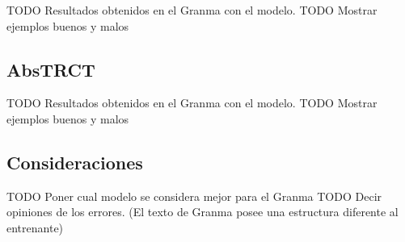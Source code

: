 TODO Resultados obtenidos en el Granma con el modelo.
TODO Mostrar ejemplos buenos y malos

\subsection{AbsTRCT}

TODO Resultados obtenidos en el Granma con el modelo.
TODO Mostrar ejemplos buenos y malos

\subsection{Consideraciones}

TODO Poner cual modelo se considera mejor para el Granma 
TODO Decir opiniones de los errores. (El texto de Granma posee una estructura diferente al entrenante)
